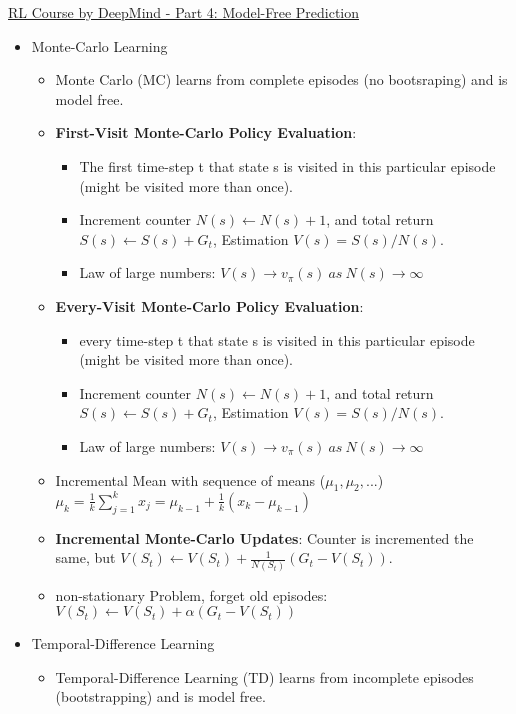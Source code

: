 \href{https://www.youtube.com/watch?v=PnHCvfgC_ZA}{RL Course by DeepMind - Part 4: Model-Free Prediction}
\begin{itemize}[noitemsep,nolistsep]
	\item Monte-Carlo Learning
	\begin{itemize}[noitemsep,nolistsep]
		\item Monte Carlo (MC) learns from complete episodes (no bootsraping) and is model free.
		\item \textbf{First-Visit Monte-Carlo Policy Evaluation}:
		\begin{itemize}[noitemsep,nolistsep]
			\item The first time-step t that state s is visited in this particular episode (might be visited more than once).
			\item Increment counter $N(s) \leftarrow N(s) + 1$, and total return $S(s) \leftarrow S(s) + G_t$, Estimation $V(s) = S(s)/N(s)$.
			\item Law of large numbers: $V(s) \rightarrow v_\pi(s)\ as\ N(s) \rightarrow \infty$
		\end{itemize}
		\item \textbf{Every-Visit Monte-Carlo Policy Evaluation}:
		\begin{itemize}[noitemsep,nolistsep]
			\item every time-step t that state s is visited in this particular episode (might be visited more than once).
			\item Increment counter $N(s) \leftarrow N(s) + 1$, and total return $S(s) \leftarrow S(s) + G_t$, Estimation $V(s) = S(s)/N(s)$.
			\item Law of large numbers: $V(s) \rightarrow v_\pi(s)\ as\ N(s) \rightarrow \infty$
		\end{itemize}
		\item Incremental Mean with sequence of means ($\mu_1,\mu_2,...$)  $\mu_k = \frac{1}{k}\sum_{j=1}^k x_j = \mu_{k-1} + \frac{1}{k}(x_k - \mu_{k-1})$
		\item \textbf{Incremental Monte-Carlo Updates}: Counter is incremented the same, but $V(S_t) \leftarrow V(S_t) + \frac{1}{N(S_t)} (G_t - V(S_t))$.
		\item non-stationary Problem, forget old episodes: $V(S_t) \leftarrow V(S_t) + \alpha (G_t - V(S_t))$
	\end{itemize}
	\item Temporal-Difference Learning
	\begin{itemize}[noitemsep,nolistsep]
		\item Temporal-Difference Learning (TD) learns from incomplete episodes (bootstrapping) and is model free.

\end{itemize}
\end{itemize}
